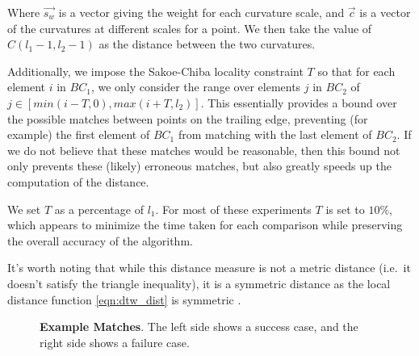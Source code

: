Where $\vec{s_w}$ is a vector giving the weight for each curvature scale, and $\vec{c}$ is a vector of the curvatures at different scales for a point.
We then take the value of $C(l_1-1, l_2-1)$ as the distance between the two curvatures.

Additionally, we impose the Sakoe-Chiba \cite{sakoe1978dynamic} locality constraint $T$ so that for each element $i$ in $BC_1$, we only consider the range over elements $j$ in $BC_2$ of $j \in [min(i - T, 0), max(i + T, l_2)]$.
This essentially provides a bound over the possible matches between points on the trailing edge, preventing (for example) the first element of $BC_1$ from matching with the last element of $BC_2$.
If we do not believe that these matches would be reasonable, then this bound not only prevents these (likely) erroneous matches, but also greatly speeds up the computation of the distance.

We set $T$ as a percentage of $l_1$.
For most of these experiments $T$ is set to $10\%$, which appears to minimize the time taken for each comparison while preserving the overall accuracy of the algorithm.

It's worth noting that while this distance measure is not a metric distance (i.e.\ it doesn't satisfy the triangle inequality), it is a symmetric distance as the local distance function \eqref{eqn:dtw_dist} is symmetric \cite{muller2007information}.



\begin{figure}[t]%
\centering
{}
\newline
{}
\newline
{}
\newline
{}
\newline
{}
\newline
{}
\caption{\textbf{Example Matches}. The left side shows a success case, and the right side shows a failure case.} 
\label{fig:example_match}
\end{figure}

